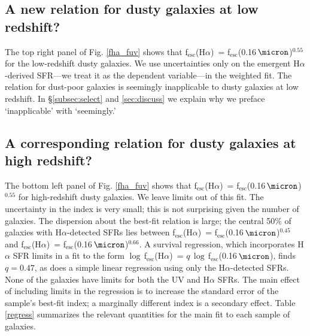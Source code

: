 \documentclass[preprint]{aastex}
\newcommand{\alephuv}{f$_{\mathrm{esc}}$(0.16$\,\micron$)}
\newcommand{\alephha}{f$_{\mathrm{esc}}$(H$\alpha$)}
\newcommand{\alephuvha}{f$_{\mathrm{esc}}$(0.66$\,\micron$)}
\begin{document}
\subsection{A new relation for dusty galaxies at low redshift?}

The top right panel of Fig. \ref{fha_fuv} shows that \alephha~=
\alephuv$^{0.55}$ for the low-redshift
dusty galaxies.  We use uncertainties only on the emergent H$\alpha$-derived
SFR---we treat it as the dependent variable---in the weighted fit.  The relation
for dust-poor galaxies is seemingly inapplicable to dusty galaxies at
low redshift.  In \S\ref{subsec:select} and \ref{sec:discuss} we explain why we
preface `inapplicable' with `seemingly.'


\subsection{A corresponding relation for dusty galaxies at high
redshift?}\label{subsec:highz}

The bottom left panel of Fig. \ref{fha_fuv} shows that \alephha~=
\alephuv$^{0.55}$ for high-redshift
dusty galaxies.  We leave limits out of this fit.  The uncertainty in
the index is very small; this is not surprising given the number of galaxies.
The dispersion about the best-fit relation is large; the central 50\% of
galaxies with H$\alpha$-detected SFRs lies between \alephha~= \alephuv$^{0.45}$
and \alephha~= \alephuv$^{0.66}$.  A survival regression, which incorporates
H$\alpha$ SFR limits in a fit to the form $\log\,$\alephha~=
$q\,\log\,$\alephuv, finds $q = 0.47$, as does a simple linear regression using
only the H$\alpha$-detected SFRs.  None of the galaxies have limits for both
the UV and H$\alpha$ SFRs.  The main effect of including limits in the
regression is to increase the standard error of the sample's best-fit index; a
marginally different index is a secondary effect.  Table \ref{regress}
summarizes the relevant quantities for the main fit to each sample of galaxies.
\end{document}
